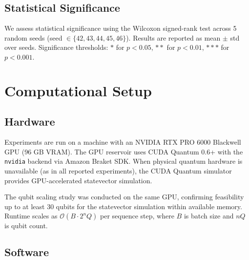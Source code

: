 
\subsection{Statistical Significance}

We assess statistical significance using the Wilcoxon signed-rank test
across 5 random seeds (seed $\in \{42, 43, 44, 45, 46\}$). Results are
reported as mean $\pm$ std over seeds. Significance thresholds: $*$
for $p < 0.05$, $**$ for $p < 0.01$, $***$ for $p < 0.001$.



\section{Computational Setup}
\label{sec:compute_setup}


\subsection{Hardware}

Experiments are run on a machine with an NVIDIA RTX PRO 6000 Blackwell
GPU (96 GB VRAM). The GPU reservoir uses CUDA Quantum 0.6+ with the
\verb|nvidia| backend via Amazon Braket SDK. When physical quantum hardware
is unavailable (as in all reported experiments), the CUDA Quantum
simulator provides GPU-accelerated statevector simulation.


The qubit scaling study was conducted on the same GPU, confirming
feasibility up to at least 30 qubits for the statevector simulation
within available memory. Runtime scales as $\mathcal{O}(B \cdot 2^nQ)$
per sequence step, where $B$ is batch size and $nQ$ is qubit count.


\subsection{Software}

